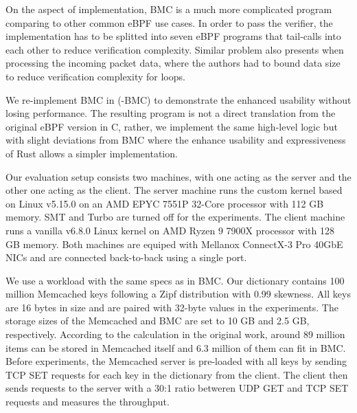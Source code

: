 On the aspect of implementation, BMC is a much more complicated program
    comparing to other common eBPF use cases.
In order to pass the verifier, the implementation has to be splitted into seven
    eBPF programs that tail-calls into each other to reduce verification
    complexity.
Similar problem also presents when processing the incoming packet data, where
    the authors had to bound data size to reduce verification complexity for
    loops.

We re-implement BMC in \projname{} (\projname{}-BMC) to demonstrate the
    enhanced usability without losing performance.
The resulting program is not a direct translation from the original eBPF
    version in C, rather, we implement the same high-level logic but with
    slight deviations from BMC where the enhance usability and expressiveness
    of Rust allows a simpler implementation.

Our evaluation setup consists two machines, with one
    acting as the server and the other one acting as the client.
The server machine runs the \projname{} custom kernel based on Linux v5.15.0 on
    an AMD EPYC 7551P 32-Core processor with 112 GB memory.
SMT and Turbo are turned off for the experiments.
The client machine runs a vanilla v6.8.0 Linux kernel on AMD Ryzen 9 7900X
    processor with 128 GB memory.
Both machines are equiped with Mellanox ConnectX-3 Pro 40GbE NICs and are
    connected back-to-back using a single port.


We use a workload with the same specs as in BMC.
Our dictionary contains 100 million Memcached keys following a Zipf
    distribution with 0.99 skewness.
All keys are 16 bytes in size and are paired with 32-byte values in the
    experiments.
The storage sizes of the Memcached and BMC are set to 10 GB and 2.5 GB,
    respectively.
According to the calculation in the original work, around 89 million items
    can be stored in Memcached itself and 6.3 million of them can fit in
    BMC.
Before experiments, the Memcached server is pre-loaded with all keys by
    sending TCP SET requests for each key in the dictionary from the client.
The client then sends requests to the server with a 30:1 ratio betweren UDP GET and
    TCP SET requests and measures the throughput.

